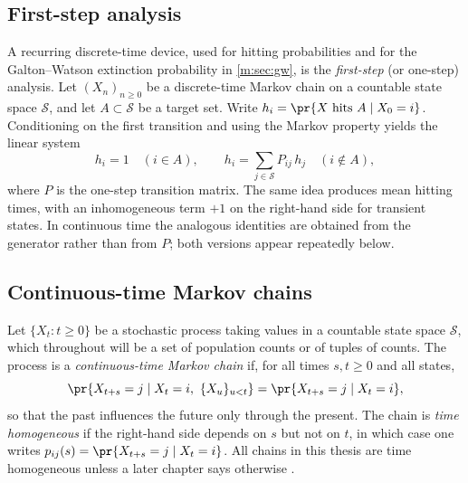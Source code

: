 \subsection{First-step analysis}
\label{m:sec:firststep}

A recurring discrete-time device, used for hitting probabilities and for the
Galton--Watson extinction probability in \cref{m:sec:gw}, is the \emph{first-step}
(or one-step) analysis. Let $(X_n)_{n\ge0}$ be a discrete-time Markov chain on a
countable state space $\mathcal S$, and let $A\subset\mathcal S$ be a target set.
Write $h_i = \pr{X\text{ hits }A\mid X_0=i}$. Conditioning on the first transition
and using the Markov property yields the linear system
\begin{equation}
\label{m:eq:firststep}
h_i = 1\quad(i\in A),
\qquad
h_i = \sum_{j\in\mathcal S} P_{ij}\,h_j\quad(i\notin A),
\end{equation}
where $P$ is the one-step transition matrix. The same idea produces mean hitting
times, with an inhomogeneous term $+1$ on the right-hand side for transient states.
In continuous time the analogous identities are obtained from the generator rather
than from $P$; both versions appear repeatedly below.

\subsection{Continuous-time Markov chains}
\label{m:sec:ctmc}

Let $\{X_t : t\ge0\}$ be a stochastic process taking values in a countable state
space $\mathcal S$, which throughout will be a set of population counts or of
tuples of counts. The process is a \emph{continuous-time Markov chain} if, for all
times $s,t\ge0$ and all states,
\begin{equation}
\label{m:eq:markov}
\pr{X_{t+s} = j \mid X_t = i,\ \{X_u\}_{u<t}} = \pr{X_{t+s}=j\mid X_t = i},
\end{equation}
so that the past influences the future only through the present. The chain is
\emph{time homogeneous} if the right-hand side depends on $s$ but not on $t$, in
which case one writes $p_{ij}(s) = \pr{X_{t+s}=j\mid X_t=i}$. All chains in this
thesis are time homogeneous unless a later chapter says otherwise
.

